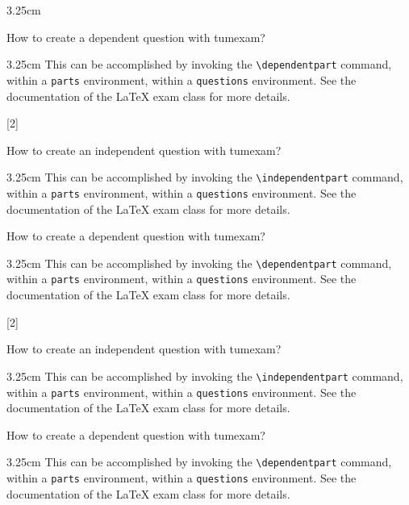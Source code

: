 \documentclass[english, @CLASSOPTIONS@]{tumexam}
\begin{document}
\begin{questions}
\begin{parts}
\begin{solutionbox}{3.25cm}
    \end{solutionbox}
    \dependentpart
    How to create a dependent question with tumexam?
    \begin{solutionbox}{3.25cm}
      This can be accomplished by invoking the \texttt{\textbackslash{dependentpart}} command, within a \texttt{parts} environment, within a \texttt{questions} environment. See the documentation of the \LaTeX{} exam class for more details.
    \end{solutionbox}
  \end{parts}
  \clearpage
  [2]
  \begin{parts}
    \independentpart
    How to create an independent question with tumexam?
    \begin{solutionbox}{3.25cm}
      This can be accomplished by invoking the \texttt{\textbackslash{independentpart}} command, within a \texttt{parts} environment, within a \texttt{questions} environment. See the documentation of the \LaTeX{} exam class for more details.
    \end{solutionbox}
    \dependentpart
    How to create a dependent question with tumexam?
    \begin{solutionbox}{3.25cm}
      This can be accomplished by invoking the \texttt{\textbackslash{dependentpart}} command, within a \texttt{parts} environment, within a \texttt{questions} environment. See the documentation of the \LaTeX{} exam class for more details.
    \end{solutionbox}
  \end{parts}
  \clearpage
  [2]
  \begin{parts}
    \independentpart
    How to create an independent question with tumexam?
    \begin{solutionbox}{3.25cm}
      This can be accomplished by invoking the \texttt{\textbackslash{independentpart}} command, within a \texttt{parts} environment, within a \texttt{questions} environment. See the documentation of the \LaTeX{} exam class for more details.
    \end{solutionbox}
    \dependentpart
    How to create a dependent question with tumexam?
    \begin{solutionbox}{3.25cm}
      This can be accomplished by invoking the \texttt{\textbackslash{dependentpart}} command, within a \texttt{parts} environment, within a \texttt{questions} environment. See the documentation of the \LaTeX{} exam class for more details.

\end{solutionbox}
\end{parts}
\end{questions}
\end{document}
